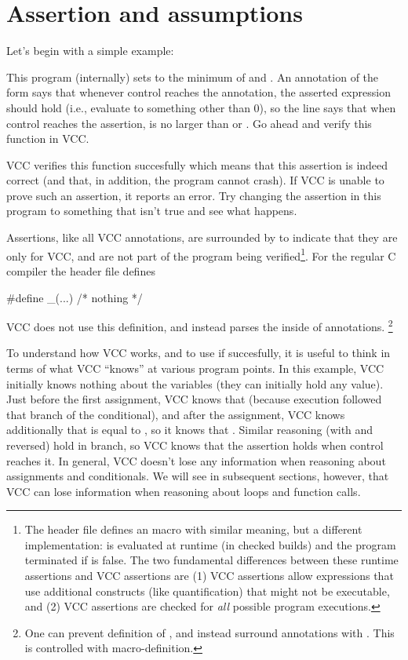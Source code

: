 \section{Assertion and assumptions}
Let's begin with a simple example:

This program (internally) sets  to the minimum of  and
. An annotation of the form  says that whenever
control reaches the annotation, the asserted expression should hold (i.e.,
evaluate to something other than 0), so the line 
 says that when control reaches the
assertion,  is no larger than  or . Go ahead and
verify this function in VCC. 

VCC verifies this function succesfully which means that this assertion
is indeed correct (and that, in addition, the program cannot
crash). If VCC is unable to prove such an assertion, it reports an
error. Try changing the assertion in this program to something that
isn't true and see what happens.

Assertions, like all VCC annotations, 
are surrounded by  to indicate that they are
only for VCC, and are not part of the program being verified\footnote{
  The  header file defines an  macro
  with similar meaning, but a different implementation: 
   is evaluated at runtime (in checked builds) and
  the program terminated if  is false.  The two fundamental
  differences between these runtime assertions and VCC assertions are
  (1) VCC assertions allow expressions that use additional constructs
  (like quantification) that might not be executable, and (2) VCC
  assertions are checked for \emph{all} possible program executions.}.  
For the regular C compiler the  header file defines
\begin{VCC}
#define _(...) /* nothing */
\end{VCC}
VCC does not use this definition, and instead parses the inside of 
annotations.%
\footnote{
  One can prevent definition of \vcc{_}, and instead surround annotations with
  .
  This is controlled with  macro-definition.}

To understand how VCC works, and to use if succesfully, it is useful to
think in terms of what VCC ``knows'' at various program points. In
this example, VCC initially knows nothing about the variables (they
can initially hold any value). Just before the first assignment, VCC knows that 
 (because execution followed that branch of the conditional), and
after the assignment, VCC knows additionally that  is equal to
, so it knows that . Similar reasoning
(with  and  reversed) hold in  branch, so VCC
knows that the assertion holds when control reaches it. In general,
VCC doesn't lose any information when reasoning about assignments and
conditionals. We will see in subsequent sections, however, that VCC
can lose information when reasoning about loops and function calls.

